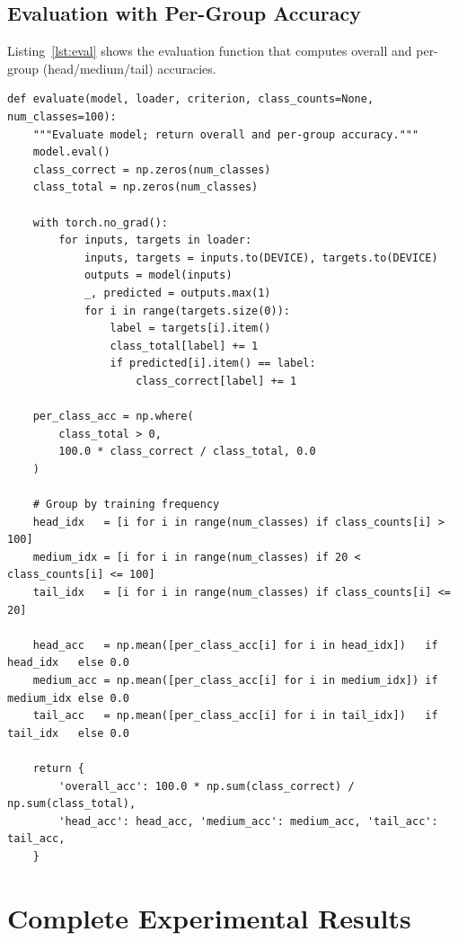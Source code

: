 \documentclass[12pt,a4paper]{article}
\begin{document}
\subsection{Evaluation with Per-Group Accuracy}
\label{app:eval_code}

Listing~\ref{lst:eval} shows the evaluation function that computes overall and per-group (head/medium/tail) accuracies.

\begin{lstlisting}[caption={Evaluation function with head/medium/tail group accuracy computation.}, label=lst:eval]
def evaluate(model, loader, criterion, class_counts=None, num_classes=100):
    """Evaluate model; return overall and per-group accuracy."""
    model.eval()
    class_correct = np.zeros(num_classes)
    class_total = np.zeros(num_classes)
    
    with torch.no_grad():
        for inputs, targets in loader:
            inputs, targets = inputs.to(DEVICE), targets.to(DEVICE)
            outputs = model(inputs)
            _, predicted = outputs.max(1)
            for i in range(targets.size(0)):
                label = targets[i].item()
                class_total[label] += 1
                if predicted[i].item() == label:
                    class_correct[label] += 1
    
    per_class_acc = np.where(
        class_total > 0,
        100.0 * class_correct / class_total, 0.0
    )
    
    # Group by training frequency
    head_idx   = [i for i in range(num_classes) if class_counts[i] > 100]
    medium_idx = [i for i in range(num_classes) if 20 < class_counts[i] <= 100]
    tail_idx   = [i for i in range(num_classes) if class_counts[i] <= 20]
    
    head_acc   = np.mean([per_class_acc[i] for i in head_idx])   if head_idx   else 0.0
    medium_acc = np.mean([per_class_acc[i] for i in medium_idx]) if medium_idx else 0.0
    tail_acc   = np.mean([per_class_acc[i] for i in tail_idx])   if tail_idx   else 0.0
    
    return {
        'overall_acc': 100.0 * np.sum(class_correct) / np.sum(class_total),
        'head_acc': head_acc, 'medium_acc': medium_acc, 'tail_acc': tail_acc,
    }
\end{lstlisting}


\section{Complete Experimental Results}
\label{app:full_results}
\end{document}
